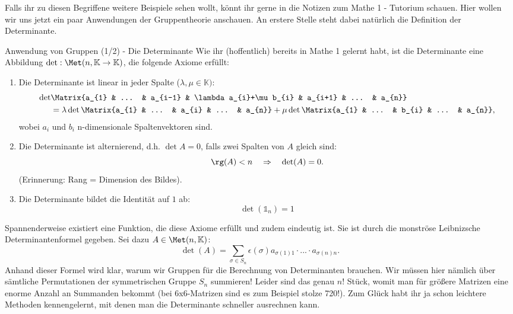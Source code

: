 Falls ihr zu diesen Begriffene weitere Beispiele sehen wollt, könnt ihr gerne in die Notizen zum Mathe 1 - Tutorium schauen. Hier wollen wir uns jetzt ein paar Anwendungen der Gruppentheorie anschauen. An erstere Stelle steht dabei natürlich die Definition der Determinante.
\begin{Beispiel}
{Anwendung von Gruppen (1/2) - Die Determinante}
Wie ihr (hoffentlich) bereits in Mathe 1 gelernt habt, ist die Determinante eine Abbildung $\det : \Met(n,\mathbb{K} \rightarrow \mathbb{K})$, die folgende Axiome erfüllt:
\begin{enumerate}
    \item Die Determinante ist linear in jeder Spalte ($\lambda, \mu \in \mathbb{K}):$
    \begin{align*}
        \det&\Matrix{a_{1} & ... & a_{i-1} & \lambda a_{i}+\mu b_{i} & a_{i+1} & ... & a_{n}} \\ &= \lambda \det \Matrix{a_{1} & ... & a_{i} & ... & a_{n}} + \mu \det \Matrix{a_{1} & ... & b_{i} & ... & a_{n}},
    \end{align*}
    wobei $a_{i}$ und $b_{i}$ n-dimensionale Spaltenvektoren sind.
    \item Die Determinante ist alternierend, d.h. $\det A = 0$, falls zwei Spalten von $A$ gleich sind:
    \begin{equation*}
        \rg (A) < n \quad \Rightarrow \quad \det (A) = 0. 
    \end{equation*}
    (Erinnerung: Rang = Dimension des Bildes).
    \item Die Determinante bildet die Identität auf $1$ ab:
    \begin{equation*}
        \det (\mathds{1}_{n}) = 1
    \end{equation*}
\end{enumerate}
Spannenderweise existiert eine Funktion, die diese Axiome erfüllt und zudem eindeutig ist. Sie ist durch die monströse Leibnizsche Determinantenformel gegeben. Sei dazu $A\in \Met (n, \mathbb{K})$:
\begin{equation*}
    \det (A) = \sum_{\sigma \in S_{n}} \epsilon (\sigma) a_{\sigma(1)1}\cdot ... \cdot a_{\sigma(n)n}.
\end{equation*}
Anhand dieser Formel wird klar, warum wir Gruppen für die Berechnung von Determinanten brauchen. Wir müssen hier nämlich über sämtliche Permutationen der symmetrischen Gruppe $S_{n}$ summieren! Leider sind das genau $n!$ Stück, womit man für größere Matrizen eine enorme Anzahl an Summanden bekommt (bei 6x6-Matrizen sind es zum Beispiel stolze 720!). Zum Glück habt ihr ja schon leichtere Methoden kennengelernt, mit denen man die Determinante schneller ausrechnen kann.
\end{Beispiel}
